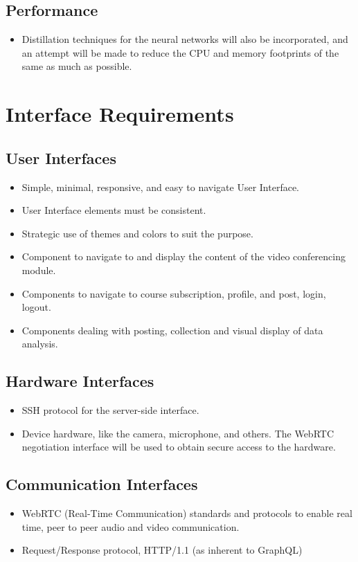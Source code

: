 \subsection{Performance}
\begin{itemize}
    \item Distillation techniques for the neural networks will also be incorporated,
    and an attempt will be made to reduce the CPU and memory footprints of the same as much as possible.
\end{itemize}

\section{Interface Requirements}

\subsection{User Interfaces}
\begin{itemize}
    \item Simple, minimal, responsive, and easy to navigate User Interface.
    \item User Interface elements must be consistent.
    \item Strategic use of themes and colors to suit the purpose.
    \item Component to navigate to and display the content of the video conferencing module.
    \item Components to navigate to course subscription, profile, and post, login, logout.
    \item Components dealing with posting, collection and visual display of data analysis.
\end{itemize}

\subsection{Hardware Interfaces}
\begin{itemize}
    \item SSH protocol for the server-side interface.
    \item Device hardware, like the camera, microphone, and others. 
    The WebRTC negotiation interface will be used to obtain secure access to the hardware.
\end{itemize}

\subsection{Communication Interfaces}
\begin{itemize}
    \item WebRTC (Real-Time Communication) standards and protocols to enable real time, peer to peer audio and video communication.
    \item Request/Response protocol, HTTP/1.1 (as inherent to GraphQL)
\end{itemize}

